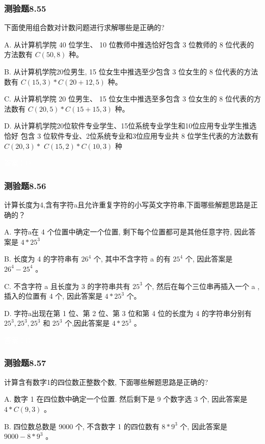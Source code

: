 \documentclass[UTF8, heading=true]{ctexart}
\begin{document}
\subsubsection{测验题8.55}

下面使用组合数对计数问题进行求解哪些是正确的?

A. 从计算机学院 40 位学生、 10 位教师中推选恰好包含 3 位教师的 8 位代表的方法数有 $C(50,8)$ 种。

B. 从计算机学院20位男生, 15 位女生中推选至少包含 3 位女生的 8 位代表的方法数有 $C(15,3) * C(20+12,5)$ 种。

C. 从计算机学院 20 位男生、 15 位女生中推选至多包含 3 位女生的 8 位代表的方法数有 $C(20,5) * C(15+15,3)$ 种。

D. 从计算机学院20位软件专业学生、15位系统专业学生和10位应用专业学生推选恰好
包含 3 位软件专业、2位系统专业和3位应用专业共 8 位学生代表的方法数有 $C(20,3) *$ $C(15,2) * C(10,3)$ 种

\textcolor{white}{答案：D}

\subsubsection{测验题8.56}

计算长度为4,含有字符a且允许重复字符的小写英文字符串,下面哪些解题思路是正确的？

A. 字符a在 4 个位置中确定一个位置, 剩下每个位置都可是其他任意字符, 因此答案是 $4 * 25^3$ 

B. 长度为 4 的字符串有 $26^4$ 个, 其中不含字符 a 的有 $25^4$ 个, 因此答案是 $26^4-25^4$ 。

C. 不含字符 a 且长度为 3 的字符串共有 $25^3$ 个, 然后在每个三位串再插入一个 a , 插入的位置有 4 个, 因此答案是 $4 * 25^3$ 个。

D. 字符a出现在第 1 位、第 2 位、第 3 位和第 4 位的长度为 4 的字符串分别有 $25^3, 25^3, 25^3$ 和 $25^3$ 个,因此答案是 $4 * 25^3$ 。

\textcolor{white}{答案：B}

\subsubsection{测验题8.57}
计算含有数字1的四位数正整数个数, 下面哪些解题思路是正确的?

A. 数字 1 在四位数中确定一个位置. 然后剩下是 9 个数字选 3 个, 因此答案是 $4 * C(9,3)$ 。

B. 四位数总数是 9000 个, 不含数字 1 的四位数有 $8 * 9^3$ 个, 因此答案是 $9000-8 * 9^3$ 。
\end{document}
